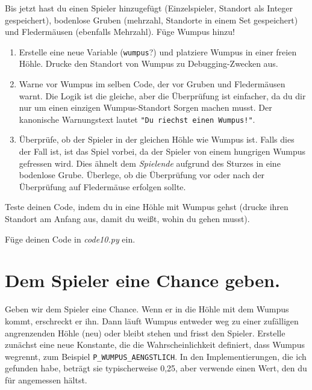 \documentclass[
]{book}
\providecommand{\tightlist}{%
  \setlength{\itemsep}{0pt}\setlength{\parskip}{0pt}}
\begin{document}
Bis jetzt hast du einen Spieler hinzugefügt (Einzelspieler, Standort als Integer gespeichert), bodenlose Gruben (mehrzahl, Standorte in einem Set gespeichert) und Fledermäusen (ebenfalls Mehrzahl). Füge Wumpus hinzu!

\begin{enumerate}
\def\labelenumi{\arabic{enumi}.}
\tightlist
\item
  Erstelle eine neue Variable (\texttt{wumpus}?) und platziere Wumpus in einer freien Höhle. Drucke den Standort von Wumpus zu Debugging-Zwecken aus.
\item
  Warne vor Wumpus im selben Code, der vor Gruben und Fledermäusen warnt. Die Logik ist die gleiche, aber die Überprüfung ist einfacher, da du dir nur um einen einzigen Wumpus-Standort Sorgen machen musst. Der kanonische Warnungstext lautet \texttt{"Du\ riechst\ einen\ Wumpus!"}.
\item
  Überprüfe, ob der Spieler in der gleichen Höhle wie Wumpus ist. Falls dies der Fall ist, ist das Spiel vorbei, da der Spieler von einem hungrigen Wumpus gefressen wird. Dies ähnelt dem \emph{Spielende} aufgrund des Sturzes in eine bodenlose Grube. Überlege, ob die Überprüfung vor oder nach der Überprüfung auf Fledermäuse erfolgen sollte.
\end{enumerate}

Teste deinen Code, indem du in eine Höhle mit Wumpus gehst (drucke ihren Standort am Anfang aus, damit du weißt, wohin du gehen musst).

Füge deinen Code in \emph{code10.py} ein.

\hypertarget{dem-spieler-eine-chance-geben.}{%
\section{Dem Spieler eine Chance geben.}\label{dem-spieler-eine-chance-geben.}}

Geben wir dem Spieler eine Chance. Wenn er in die Höhle mit dem Wumpus kommt, erschreckt er ihn. Dann läuft Wumpus entweder weg zu einer zufälligen angrenzenden Höhle (neu) oder bleibt stehen und frisst den Spieler. Erstelle zunächst eine neue Konstante, die die Wahrscheinlichkeit definiert, dass Wumpus wegrennt, zum Beispiel \texttt{P\_WUMPUS\_AENGSTLICH}. In den Implementierungen, die ich gefunden habe, beträgt sie typischerweise 0,25, aber verwende einen Wert, den du für angemessen hältst.
\end{document}
